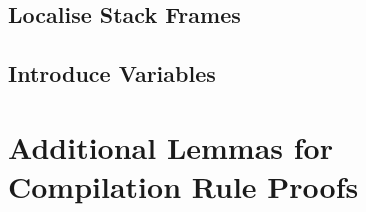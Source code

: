 

\pagebreak

\subsection{Localise Stack Frames}



\pagebreak

\subsection{Introduce Variables}



\pagebreak

\section{Additional Lemmas for Compilation Rule Proofs}

